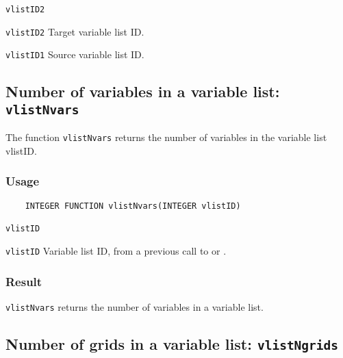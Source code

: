 \hspace*{4mm}\begin{minipage}[]{15cm}
\begin{deflist}{\texttt{vlistID2}\ }
\item[\texttt{vlistID2}]
Target variable list ID.
\item[\texttt{vlistID1}]
Source variable list ID.

\end{deflist}
\end{minipage}


\subsection{Number of variables in a variable list: \texttt{vlistNvars}}
\label{vlistNvars}

The function {\texttt{vlistNvars}} returns the number of variables in the variable list vlistID.

\subsubsection*{Usage}

\begin{verbatim}
    INTEGER FUNCTION vlistNvars(INTEGER vlistID)
\end{verbatim}

\hspace*{4mm}\begin{minipage}[]{15cm}
\begin{deflist}{\texttt{vlistID}\ }
\item[\texttt{vlistID}]
Variable list ID, from a previous call to {} or {}.

\end{deflist}
\end{minipage}

\subsubsection*{Result}

{\texttt{vlistNvars}} returns the number of variables in a variable list.



\subsection{Number of grids in a variable list: \texttt{vlistNgrids}}
\label{vlistNgrids}

